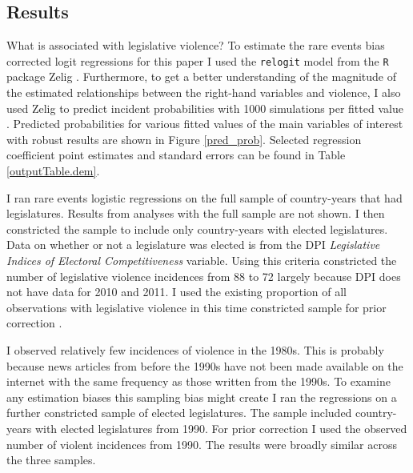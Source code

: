 \documentclass[a4paper]{article}\usepackage{graphicx, color}
\begin{document}


\subsection{Results}

What is associated with legislative violence? To estimate the rare events bias corrected logit regressions for this paper I used the {\tt{relogit}} model from the {\tt{R}} package Zelig \citep{IMAIKingZelig2008}. Furthermore, to get a better understanding of the magnitude of the estimated relationships between the right-hand variables and violence, I also used Zelig to predict incident probabilities with 1000 simulations per fitted value \citep[see][]{King2002}. Predicted probabilities for various fitted values of the main variables of interest with robust results are shown in Figure \ref{pred_prob}. Selected regression coefficient point estimates and standard errors can be found in Table \ref{outputTable.dem}. 

I ran rare events logistic regressions on the full sample of country-years that had legislatures. Results from analyses with the full sample are not shown. I then constricted the sample to include only country-years with elected legislatures. Data on whether or not a legislature was elected is from the DPI {\emph{Legislative Indices of Electoral Competitiveness}} variable. Using this criteria constricted the number of legislative violence incidences from 88 to 72 largely because DPI does not have data for 2010 and 2011. I used the existing proportion of all observations with legislative violence in this time constricted sample for prior correction \citep[see][]{KingRareEventsPA2001}. 

I observed relatively few incidences of violence in the 1980s. This is probably because news articles from before the 1990s have not been made available on the internet with the same frequency as those written from the 1990s. To examine any estimation biases this sampling bias might create I ran the regressions on a further constricted sample of elected legislatures. The sample included country-years with elected legislatures from 1990. For prior correction I used the observed number of violent incidences from 1990. The results were broadly similar across the three samples. 
\end{document}
